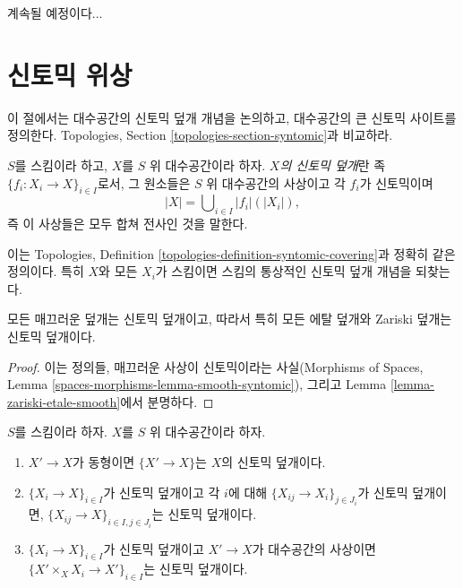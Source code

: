 \noindent
계속될 예정이다...


















\section{신토믹 위상}
\label{section-syntomic}

\noindent
이 절에서는 대수공간의 신토믹 덮개 개념을 논의하고, 대수공간의 큰
신토믹 사이트를 정의한다. Topologies, Section
\ref{topologies-section-syntomic}과 비교하라.

\begin{definition}
\label{definition-syntomic-covering}
$S$를 스킴이라 하고, $X$를 $S$ 위 대수공간이라 하자. {\it $X$의
신토믹 덮개}란 족 $\{f_i : X_i \to X\}_{i \in I}$로서, 그 원소들은
$S$ 위 대수공간의 사상이고 각 $f_i$가 신토믹이며
$$
|X| = \bigcup\nolimits_{i \in I} |f_i|(|X_i|),
$$
즉 이 사상들은 모두 합쳐 전사인 것을 말한다.
\end{definition}

\noindent
이는 Topologies, Definition \ref{topologies-definition-syntomic-covering}과
정확히 같은 정의이다. 특히 $X$와 모든 $X_i$가 스킴이면 스킴의 통상적인
신토믹 덮개 개념을 되찾는다.

\begin{lemma}
\label{lemma-zariski-etale-smooth-syntomic}
모든 매끄러운 덮개는 신토믹 덮개이고, 따라서 특히 모든 에탈 덮개와
Zariski 덮개는 신토믹 덮개이다.
\end{lemma}

\begin{proof}
이는 정의들, 매끄러운 사상이 신토믹이라는 사실(Morphisms of Spaces,
Lemma \ref{spaces-morphisms-lemma-smooth-syntomic}), 그리고 Lemma
\ref{lemma-zariski-etale-smooth}에서 분명하다.
\end{proof}

\begin{lemma}
\label{lemma-syntomic}
$S$를 스킴이라 하자. $X$를 $S$ 위 대수공간이라 하자.
\begin{enumerate}
\item $X' \to X$가 동형이면 $\{X' \to X\}$는 $X$의 신토믹 덮개이다.
\item $\{X_i \to X\}_{i\in I}$가 신토믹 덮개이고 각 $i$에 대해
$\{X_{ij} \to X_i\}_{j\in J_i}$가 신토믹 덮개이면,
$\{X_{ij} \to X\}_{i \in I, j\in J_i}$는 신토믹 덮개이다.
\item $\{X_i \to X\}_{i\in I}$가 신토믹 덮개이고 $X' \to X$가
대수공간의 사상이면
$\{X' \times_X X_i \to X'\}_{i\in I}$는 신토믹 덮개이다.
\end{enumerate}
\end{lemma}


